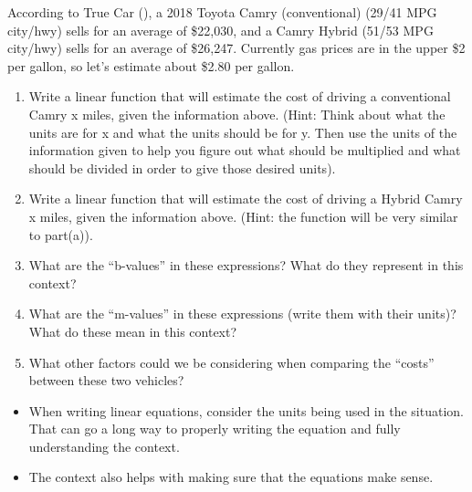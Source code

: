 \documentclass{ximera}
\begin{document}
\begin{exploration}
According to True Car (), a 2018 Toyota Camry (conventional) (29/41 MPG city/hwy) sells for an average of  \$22,030, and a Camry Hybrid (51/53 MPG city/hwy) sells for an average of \$26,247.  Currently gas prices are in the upper \$2 per gallon, so let's estimate about \$2.80 per gallon.
\begin{enumerate}
\item Write a linear function that will estimate the cost of driving a conventional Camry x miles, given the information above.  (Hint: Think about what the units are for x and what the units should be for y.  Then use the units of the information given to help you figure out what should be multiplied and what should be divided  in order to give those desired units).
\item Write a linear function that will estimate the cost of driving a Hybrid Camry x miles, given the information above.  (Hint: the function will be very similar to part(a)).
\item What are the ``b-values'' in these expressions?  What do they represent in this context?
\item What are the ``m-values'' in these expressions (write them with their units)?  What do these mean in this context?
\item What other factors could we be considering when comparing the ``costs'' between these two vehicles?
\end{enumerate}
\end{exploration}


\begin{summary}\begin{itemize}
\item When writing linear equations, consider the units being used in the situation. That can go a long way to properly writing the equation and fully understanding the context.
\item The context also helps with making sure that the equations make sense. 
\end{itemize}\end{summary}
\end{document}
